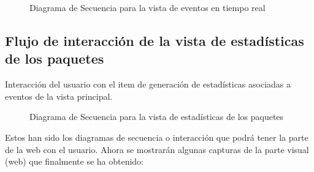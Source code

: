 \begin{figure}[H]
\caption{Diagrama de Secuencia para la vista de eventos en tiempo real}
\end{figure}

\subsection{Flujo de interacción de la vista de estadísticas de los paquetes}
Interacción del usuario con el item de generación de estadísticas asociadas a eventos de la vista principal.

\begin{figure}[H]
\caption{Diagrama de Secuencia para la vista de estadísticas de los paquetes}
\end{figure}
\newpage
Estos han sido los diagramas de secuencia o interacción que podrá tener la parte de la web con el usuario. Ahora se mostrarán algunas capturas de la parte visual (web) que finalmente se ha obtenido:\\

